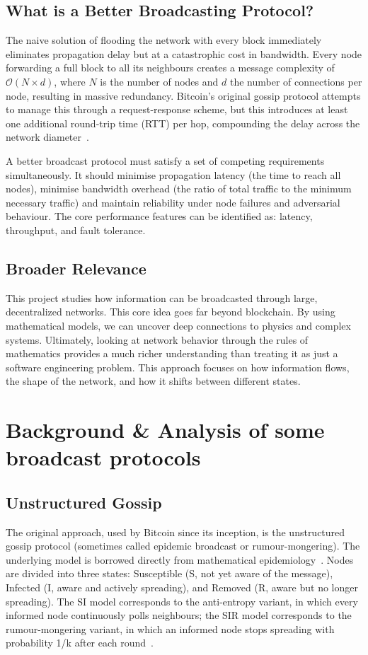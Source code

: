 \documentclass{article}
\begin{document}
\subsection{What is a Better Broadcasting Protocol?}
The naive solution of flooding the network with every block immediately eliminates propagation delay but at a catastrophic cost in bandwidth. Every node forwarding a full block to all its neighbours creates a message complexity of $\mathcal{O}{(N\times d)}$, where $N$ is the number of nodes and $d$ the number of connections per node, resulting in massive redundancy. Bitcoin's original gossip protocol attempts to manage this through a request-response scheme, but this introduces at least one additional round-trip time (RTT) per hop, compounding the delay across the network diameter~\cite{deckerInformationPropagationBitcoin2013}.

A better broadcast protocol must satisfy a set of competing requirements simultaneously. It should minimise propagation latency (the time to reach all nodes), minimise bandwidth overhead (the ratio of total traffic to the minimum necessary traffic) and maintain reliability under node failures and adversarial behaviour. The core performance features can be identified as: latency, throughput, and fault tolerance.


\subsection{Broader Relevance}
This project studies how information can be broadcasted through large, decentralized networks. This core idea goes far beyond blockchain. By using mathematical models, we can uncover deep connections to physics and complex systems. Ultimately, looking at network behavior through the rules of mathematics provides a much richer understanding than treating it as just a software engineering problem. This approach focuses on how information flows, the shape of the network, and how it shifts between different states.




\section{Background \& Analysis of some broadcast protocols}
\subsection{Unstructured Gossip}
The original approach, used by Bitcoin since its inception, is the unstructured gossip protocol (sometimes called epidemic broadcast or rumour-mongering). The underlying model is borrowed directly from mathematical epidemiology~\cite{demersEpidemicAlgorithmsReplicated1987}. Nodes are divided into three states: Susceptible (S, not yet aware of the message), Infected (I, aware and actively spreading), and Removed (R, aware but no longer spreading). The SI model corresponds to the anti-entropy variant, in which every informed node continuously polls neighbours; the SIR model corresponds to the rumour-mongering variant, in which an informed node stops spreading with probability 1/k after each round~\cite{demersEpidemicAlgorithmsReplicated1987}.
\end{document}
